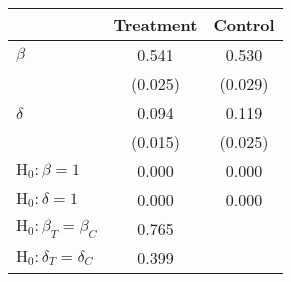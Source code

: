 {
\def\sym#1{\ifmmode^{#1}\else\(^{#1}\)\fi}
\begin{tabular}{l*{2}{c}}
\toprule
          &\multicolumn{1}{c}{Treatment}&\multicolumn{1}{c}{Control}\\
\midrule
\(\beta\) &    0.541&    0.530\\
          &  (0.025)&  (0.029)\\
\(\delta\)&    0.094&    0.119\\
          &  (0.015)&  (0.025)\\
\midrule \(\mathrm{H}_0: \beta = 1\)&    0.000&    0.000\\
\(\mathrm{H}_0: \delta = 1\)&    0.000&    0.000\\
\(\mathrm{H}_0: \beta_T = \beta_C\)&    0.765&         \\
\(\mathrm{H}_0: \delta_T = \delta_C\)&    0.399&         \\
\bottomrule
\end{tabular}
}
